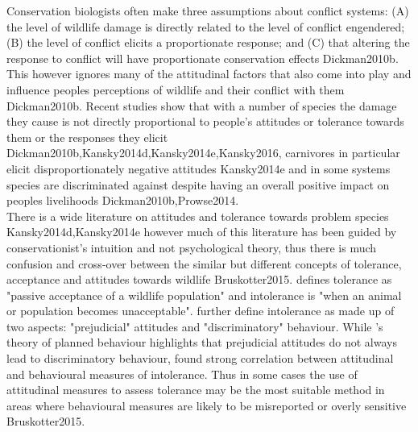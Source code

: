 Conservation biologists often make three assumptions about conflict systems: (A) the level of wildlife damage is directly related to the level of conflict engendered; (B) the level of conflict elicits a proportionate response; and (C) that altering the response to conflict will have proportionate conservation effects  {Dickman2010b}. This however ignores many of the attitudinal factors that also come into play and influence peoples perceptions of wildlife and their conflict with them {Dickman2010b}. Recent studies show that with a number of species the damage they cause is not directly proportional to people's attitudes or tolerance towards them or the responses they elicit {Dickman2010b,Kansky2014d,Kansky2014e,Kansky2016}, carnivores in particular elicit disproportionately negative attitudes {Kansky2014e} and in some systems species are discriminated against despite having an overall positive impact on peoples livelihoods {Dickman2010b,Prowse2014}.\\

There is a wide literature on attitudes and tolerance towards problem species {Kansky2014d,Kansky2014e} however much of this literature has been guided by conservationist's intuition and not psychological theory, thus there is much confusion and cross-over between the similar but different concepts of tolerance, acceptance and attitudes towards wildlife {Bruskotter2015}. \citet{Bruskotter2012} defines tolerance as "passive acceptance of a wildlife population" and intolerance is "when an animal or population becomes unacceptable". \citet{Bruskotter2015,Treves2012b} further define intolerance as made up of two aspects: "prejudicial" attitudes and "discriminatory" behaviour. While \citet{Ajzen1991}'s theory of planned behaviour highlights that prejudicial attitudes do not always lead to discriminatory behaviour, \citet{Bruskotter2015} found strong correlation between attitudinal and behavioural measures of intolerance. Thus in some cases the use of attitudinal measures to assess tolerance may be the most suitable method in areas where behavioural measures are likely to be misreported or overly sensitive {Bruskotter2015}.\\

